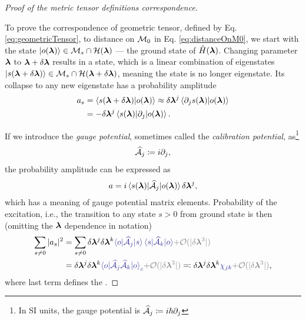 \begin{proof}[Proof of the  metric tensor definitions correspondence]\
    \label{sec:derivationOfGeometricTensor}

    To prove the correspondence of geometric tensor, defined by Eq. \ref{eq:geometricTensor}, to distance on $\M_0$ in Eq. \ref{eq:distanceOnM0}, we start with the state $\ket{o(\llambda)}\in \M_s\cap\H(\llambda)$ — the ground state of $\HH(\llambda)$. Changing parameter $\llambda$ to $\llambda+\delta \llambda$ results in a state, which is a linear combination of eigenstates $\ket{s(\llambda+\delta \llambda)}\in \M_s\cap\H(\llambda+\delta \llambda)$, meaning the state is no longer eigenstate. Its collapse to any new eigenstate has a probability amplitude
    \begin{equation}
        \begin{split}
            a_s&=\braket{s(\llambda+\delta\llambda)|o(\llambda)}\approx \delta\llambda^j\braket{\partial_j s(\llambda)|o(\llambda)} \\
            &= -\delta\llambda^j\braket{s(\llambda)|\partial_j|o(\llambda)}.
        \end{split}
    \end{equation}

    If we introduce the \emph{gauge potential}, sometimes called the \emph {calibration potential}, as\footnote{In SI units, the gauge potential is $\AA_j\coloneqq i\hbar\partial_{j}$}
    \begin{equation}
        \AA_j\coloneqq i\partial_{j},
    \end{equation}
    the probability amplitude can be expressed as
    \begin{equation}
    a=i\braket{s(\llambda)|\AA_j |o(\llambda)}\delta\llambda^j,
    \label{eq:probabilityOfTransitionIsGauge}
    \end{equation}
    which has a meaning of gauge potential matrix elements. Probability of the excitation, i.e., the transition to any state $s>0$ from ground state is then (omitting the $\llambda$ dependence in notation)
    \begin{equation}
        \begin{split}
            \sum_{s\neq 0}|a_s|^2&=  \sum_{s\neq 0} \delta \llambda^j \delta \llambda^k\bluee{\braket{o|\AA_j|s}\braket{s|\AA_k|o}}\gray{+\O(|\delta \llambda^3|)} \\
            &= \delta \llambda^j \delta \llambda^k\bluee{\braket{o|\AA_j \AA_k|o}_c}\gray{+\O(|\delta \llambda^3|)}\eqqcolon \delta \llambda^j \delta \llambda^k\bluee{\chi_{jk}}\gray{+\O(|\delta \llambda^3|)},
        \end{split}
    \end{equation}
    where last term defines the .
\end{proof}






